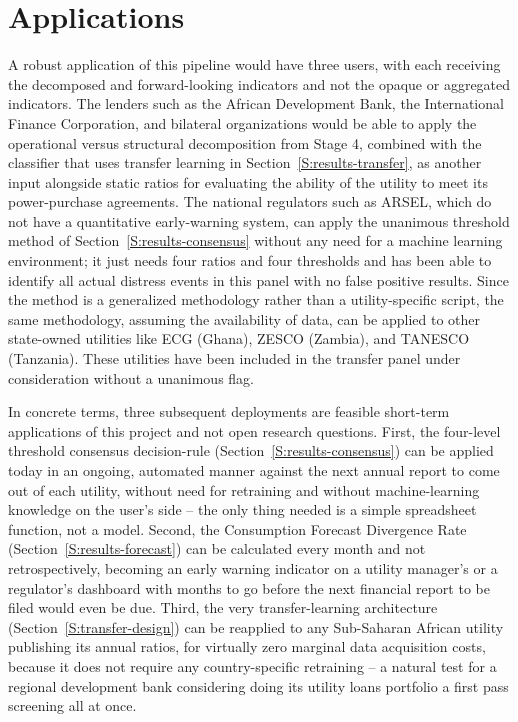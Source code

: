 \documentclass[final,1p,times]{elsarticle}
\begin{document}

\section{Applications}
\label{S:applications}

A robust application of this pipeline would have three users, with each receiving the decomposed and forward-looking indicators and not the opaque or aggregated indicators. The lenders such as the African Development Bank, the International Finance Corporation, and bilateral organizations would be able to apply the operational versus structural decomposition from Stage 4, combined with the classifier that uses transfer learning in Section~\ref{S:results-transfer}, as another input alongside static ratios for evaluating the ability of the utility to meet its power-purchase agreements. The national regulators such as ARSEL, which do not have a quantitative early-warning system, can apply the unanimous threshold method of Section~\ref{S:results-consensus} without any need for a machine learning environment; it just needs four ratios and four thresholds and has been able to identify all actual distress events in this panel with no false positive results. Since the method is a generalized methodology rather than a utility-specific script, the same methodology, assuming the availability of data, can be applied to other state-owned utilities like ECG (Ghana), ZESCO (Zambia), and TANESCO (Tanzania). These utilities have been included in the transfer panel under consideration without a unanimous flag.

In concrete terms, three subsequent deployments are feasible short-term applications of this project and not open research questions. First, the four-level threshold consensus decision-rule (Section~\ref{S:results-consensus}) can be applied today in an ongoing, automated manner against the next annual report to come out of each utility, without need for retraining and without machine-learning knowledge on the user's side -- the only thing needed is a simple spreadsheet function, not a model. Second, the Consumption Forecast Divergence Rate (Section~\ref{S:results-forecast}) can be calculated every month and not retrospectively, becoming an early warning indicator on a utility manager's or a regulator's dashboard with months to go before the next financial report to be filed would even be due. Third, the very transfer-learning architecture (Section~\ref{S:transfer-design}) can be reapplied to any Sub-Saharan African utility publishing its annual ratios, for virtually zero marginal data acquisition costs, because it does not require any country-specific retraining -- a natural test for a regional development bank considering doing its utility loans portfolio a first pass screening all at once.
\end{document}
